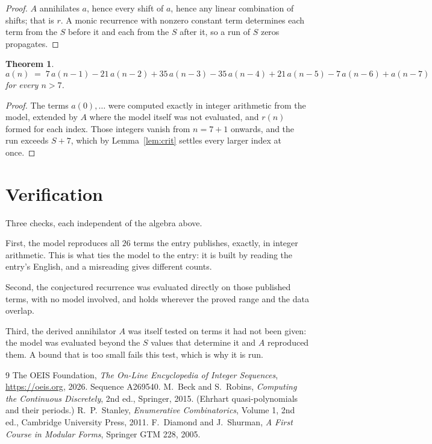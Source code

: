 \documentclass[11pt,a4paper]{article}
\theoremstyle{plain}
\newtheorem{theorem}{Theorem}
\theoremstyle{definition}
\begin{document}
\begin{proof}
$A$ annihilates $a$, hence every shift of $a$, hence any linear combination of shifts; that is
$r$. A monic recurrence with nonzero constant term determines each term from the $S$ before it
and each from the $S$ after it, so a run of $S$ zeros propagates.
\end{proof}

\begin{theorem}
\[
a(n)\;=\;7\,a(n-1) - 21\,a(n-2) + 35\,a(n-3) - 35\,a(n-4) + 21\,a(n-5) - 7\,a(n-6) + a(n-7)
\]
for every $n>7$.
\end{theorem}

\begin{proof}
The terms $a(0),\dots$ were computed exactly in integer arithmetic from the model, extended by
$A$ where the model itself was not evaluated, and $r(n)$ formed for each index. Those integers
vanish from $n=7+1$ onwards, and the run exceeds $S+7$, which by
Lemma~\ref{lem:crit} settles every larger index at once.
\end{proof}

\section{Verification}

Three checks, each independent of the algebra above.

First, the model reproduces all $26$ terms the entry publishes, exactly, in integer
arithmetic. This is what ties the model to the entry: it is built by reading the entry's
English, and a misreading gives different counts.

Second, the conjectured recurrence was evaluated directly on those published terms, with no
model involved, and holds wherever the proved range and the data overlap.

Third, the derived annihilator $A$ was itself tested on terms it had not been given: the model
was evaluated beyond the $S$ values that determine it and $A$ reproduced them. A bound that is
too small fails this test, which is why it is run.

\begin{thebibliography}{9}
 The OEIS Foundation, \emph{The On-Line Encyclopedia of Integer
Sequences}, \url{https://oeis.org}, 2026. Sequence A269540.
 M.~Beck and S.~Robins, \emph{Computing the Continuous Discretely},
2nd ed., Springer, 2015. (Ehrhart quasi-polynomials and their periods.)
 R.~P.~Stanley, \emph{Enumerative Combinatorics}, Volume 1, 2nd ed.,
Cambridge University Press, 2011.
 F.~Diamond and J.~Shurman, \emph{A First Course in Modular Forms},
Springer GTM 228, 2005.
\end{thebibliography}
\end{document}
